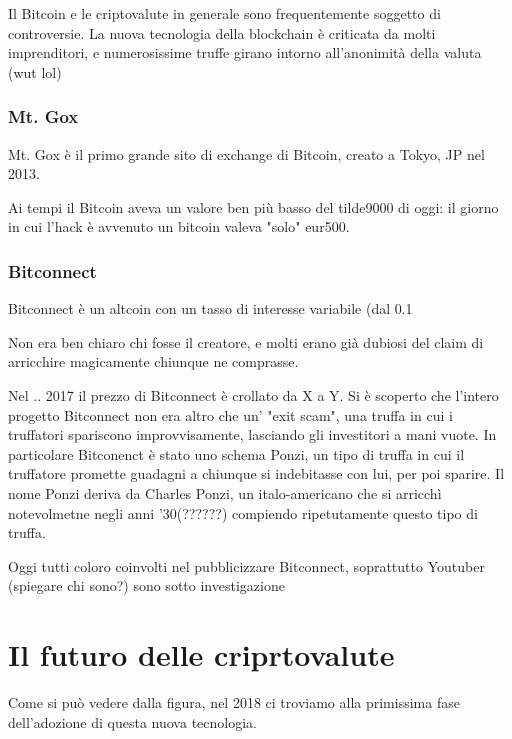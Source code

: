 \documentclass {article}
\begin{document}
Il Bitcoin e le criptovalute in generale sono frequentemente soggetto di controversie. La nuova tecnologia della blockchain è criticata da molti imprenditori, e numerosissime truffe girano intorno all'anonimità della valuta (wut lol)



\subsubsection {Mt. Gox}



Mt. Gox è il primo grande sito di exchange di Bitcoin, creato a Tokyo, JP nel 2013.

Ai tempi il Bitcoin aveva un valore ben più basso del tilde9000 di oggi: il giorno in cui l'hack è avvenuto un bitcoin valeva "solo" eur500.



\subsubsection {Bitconnect}



Bitconnect è un altcoin con un tasso di interesse variabile (dal 0.1%

Non era ben chiaro chi fosse il creatore, e molti erano già dubiosi del claim di arricchire magicamente chiunque ne comprasse.

Nel .. 2017 il prezzo di Bitconnect è crollato da X a Y. Si è scoperto che l'intero progetto Bitconnect non era altro che un' "exit scam", una truffa in cui i truffatori spariscono improvvisamente, lasciando gli investitori a mani vuote. In particolare Bitconenct è stato uno schema Ponzi, un tipo di truffa in cui il truffatore promette guadagni a chiunque si indebitasse con lui, per poi sparire. Il nome Ponzi deriva da Charles Ponzi, un italo-americano che si arricchì notevolmetne negli anni '30(??????) compiendo ripetutamente questo tipo di truffa.

Oggi tutti coloro coinvolti nel pubblicizzare Bitconnect, soprattutto Youtuber (spiegare chi sono?) sono sotto investigazione



\section {Il futuro delle criprtovalute}



Come si può vedere dalla figura, nel 2018 ci troviamo alla primissima fase dell'adozione di questa nuova tecnologia.
\end{document}
